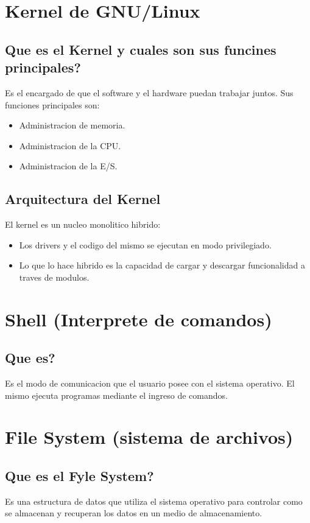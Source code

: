\documentclass[11pt]{article}
\begin{document}
\section{Kernel de GNU/Linux}

\subsection{Que es el Kernel y cuales son sus funcines principales?}
Es el encargado de que el software y el hardware puedan trabajar juntos.
Sus funciones principales son:
\begin{itemize}
    \item Administracion de memoria.
    \item Administracion de la CPU.
    \item Administracion de la E/S.
\end{itemize}

\subsection{Arquitectura del Kernel}
El kernel es un nucleo monolitico hibrido:
\begin{itemize}
    \item Los drivers y el codigo del mismo se ejecutan en modo privilegiado.
    \item Lo que lo hace hibrido es la capacidad de cargar y descargar funcionalidad a traves de modulos.
\end{itemize}

\section{Shell (Interprete de comandos)}
\subsection{Que es?}
Es el modo de comunicacion que el usuario posee con el sistema operativo. El mismo ejecuta programas mediante el ingreso de comandos.

\section{File System (sistema de archivos)}
\subsection{Que es el Fyle System?}
Es una estructura de datos que utiliza el sistema operativo para controlar como se almacenan y recuperan los datos en un medio de almacenamiento.
\end{document}
